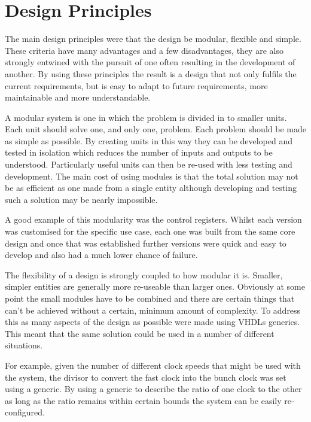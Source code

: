 \section{Design Principles} %
\label{sec:design_principles}
The main design principles were that the design be modular, flexible and simple. These criteria have many advantages and a few disadvantages, they are also strongly entwined with the pursuit of one often resulting in the development of another. By using these principles the result is a design that not only fulfils the current requirements, but is easy to adapt to future requirements, more maintainable and more understandable.

A modular system is one in which the problem is divided in to smaller units. Each unit should solve one, and only one, problem. Each problem should be made as simple as possible. By creating units in this way they can be developed and tested in isolation which reduces the number of inputs and outputs to be understood. Particularly useful units can then be re-used with less testing and development. The main cost of using modules is that the total solution may not be as efficient as one made from a single entity although developing and testing such a solution may be nearly impossible. 

A good example of this modularity was the control registers. Whilst each version was customised for the specific use case, each one was built from the same core design and once that was established further versions were quick and easy to develop and also had a much lower chance of failure.

The flexibility of a design is strongly coupled to how modular it is. Smaller, simpler entities are generally more re-useable than larger ones. Obviously at some point the small modules have to be combined and there are certain things that can't be achieved without a certain, minimum amount of complexity. To address this as many aspects of the design as possible were made using VHDLs generics. This meant that the same solution could be used in a number of different situations.

For example, given the number of different clock speeds that might be used with the system, the divisor to convert the fast clock into the bunch clock was set using a generic. By using a generic to describe the ratio of one clock to the other as long as the ratio remains within certain bounds the system can be easily re-configured.

